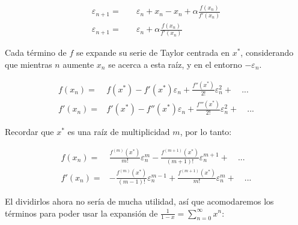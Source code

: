 \documentclass[../portafolio.tex]{subfiles}
\begin{document}
\begin{align}
\varepsilon_{n+1} =& \quad \varepsilon_n + x_n - x_n + \alpha \frac{f(x_n)}{f'(x_n)}\\
\varepsilon_{n+1} =&  \quad \varepsilon_n + \alpha \frac{f(x_n)}{f'(x_n)} \label{g0_c5:impresion}
\end{align}


Cada término de $f$ se expande su serie de Taylor \citep{openstaxcalculo2} centrada en $x^*$, considerando que mientras $n$ aumente $x_n$ se acerca a esta raíz, y en el entorno $-\varepsilon_n$.


\begin{align*}
f(x_n)=&f(x^*)-f'(x^*)\varepsilon_n + \frac{f''(x^*)}{2!}\varepsilon^2_{n}+ \quad ...\\
f'(x_n)=&f'(x^*)-f''(x^*)\varepsilon_n + \frac{f'''(x^*)}{2!}\varepsilon^2_{n}+ \quad ...
\end{align*}


Recordar que $x^*$ es una raíz de multiplicidad $m$, por lo tanto:


\begin{align}
f(x_n)=&\frac{f^{(m)}(x^*)}{m!}\varepsilon^{m}_n - \frac{f^{(m+1)}(x^*)}{(m+1)!}\varepsilon^{m+1}_n+ \quad ...\\
f'(x_n)=&-\frac{f^{(m)}(x^*)}{(m-1)!}\varepsilon^{m-1}_n + \frac{f^{(m+1)}(x^*)}{m!}\varepsilon^{m}_n+ \quad ...
\end{align}


El dividirlos ahora no sería de mucha utilidad, así que acomodaremos los términos para poder usar la expansión de $\frac{1}{1-x}= \sum_{n=0}^\infty x^n$:
\end{document}
